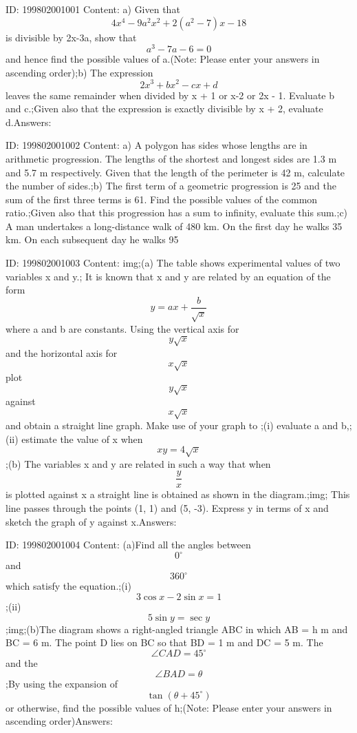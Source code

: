 \documentclass{article}
\begin{document}
ID: 199802001001
Content:
a) Given that \[4x^4-9a^2x^2+2(a^2-7)x-18\] is divisible by 2x-3a, show that \[a^3-7a-6=0\] and hence find the possible values of a.(Note: Please enter your answers in ascending order);b) The expression \[2x^3+bx^2-cx+d\] leaves the same remainder when divided by x + 1 or x-2 or 2x - 1. Evaluate b and c.;Given also that the expression is exactly divisible by x + 2, evaluate d.Answers:

ID: 199802001002
Content:
a) A polygon has sides whose lengths are in arithmetic progression. The lengths of the shortest and longest sides are 1.3 m and 5.7 m respectively. Given that the length of the perimeter is 42 m, calculate the number of sides.;b) The first term of a geometric progression is 25 and the sum of the first three terms is 61. Find the possible values of the common ratio.;Given also that this progression has a sum to infinity, evaluate this sum.;c) A man undertakes a long-distance walk of 480 km. On the first day he walks 35 km. On each subsequent day he walks 95%

ID: 199802001003
Content:
img;(a) The table shows experimental values of two variables x and y.; It is known that x and y are related by an equation of the form \[y=ax+\frac{b}{\sqrt{x}}\] where a and b are constants. Using the vertical axis for \[y\sqrt{x}\] and the horizontal axis for \[x\sqrt{x}\] plot \[y\sqrt{x}\] against \[x\sqrt{x}\] and obtain a straight line graph. Make use of your graph to ;(i) evaluate a and b,;(ii) estimate the value of x when \[xy=4\sqrt{x}\];(b) The variables x and y are related in such a way that when \[\frac{y}{x}\] is plotted against x a straight line is obtained as shown in the diagram.;img; This line passes through the points (1, 1) and (5, -3). Express y in terms of x and sketch the graph of y against x.Answers:

ID: 199802001004
Content:
(a)Find all the angles between \[0^{\circ}\]  and \[360^{\circ}\]   which satisfy the equation.;(i)\[3 \cos x - 2 \sin x = 1\];(ii) \[5 \sin y = \sec y\];img;(b)The diagram shows a right-angled triangle ABC in which AB = h m and BC = 6 m. The point D lies on BC so that BD = 1 m and DC = 5 m. The \[\angle CAD = 45^{\circ}\] and the \[\angle BAD = \theta \] ;By using the expansion of \[\tan(\theta+45^{\circ})\] or otherwise, find the possible values of h;(Note: Please enter your answers in ascending order)Answers:
\end{document}
